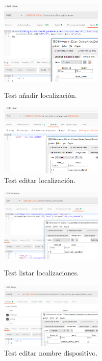 \begin{figure}[!htb]
\includegraphics[width=2.00in]{images/tests/screenshots/9addroom.PNG}
\caption{Test añadir localización.}
\endminipage\hfill
{}
\includegraphics[width=2.00in]{images/tests/screenshots/10editroom.PNG}
\caption{Test editar localización.}
\endminipage\hfill
\end{figure}

\begin{figure}[!htb]
\includegraphics[width=2.00in]{images/tests/screenshots/11listlocations.PNG}
\caption{Test listar localizaciones.}
\endminipage\hfill
{}
\includegraphics[width=2.00in]{images/tests/screenshots/12editdevice.PNG}
\caption{Test editar nombre dispositivo.}
\endminipage\hfill
\end{figure}



